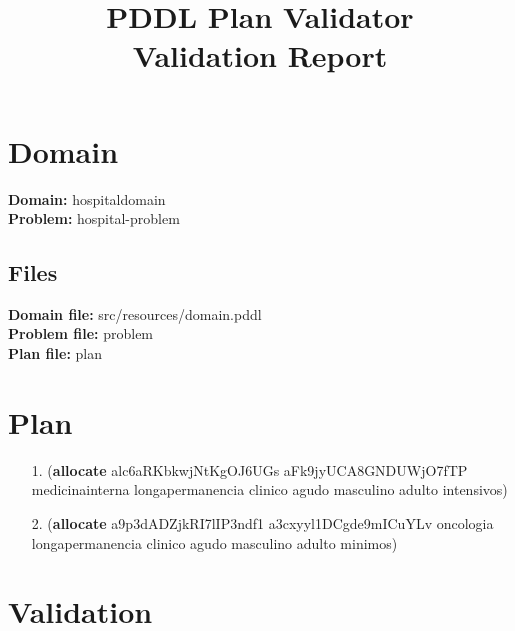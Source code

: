 \documentclass{article}
\title{\textbf{PDDL Plan Validator}\\Validation Report}
\date{} %
\begin{document}
\maketitle

\section{Domain}
\textbf{Domain:}  hospitaldomain\\
\textbf{Problem:} hospital-problem

\subsection{Files}
\textbf{Domain file:}  src/resources/domain.pddl \\
\textbf{Problem file:} problem\\
\textbf{Plan file:}    plan

\section{Plan}

\begin{itemize}
    \item[1.] (\textbf{allocate} alc6aRKbkwjNtKgOJ6UGs aFk9jyUCA8GNDUWjO7fTP medicinainterna longapermanencia clinico agudo masculino adulto intensivos)
    \item[2.] (\textbf{allocate} a9p3dADZjkRI7lIP3ndf1 a3cxyyl1DCgde9mICuYLv oncologia longapermanencia clinico agudo masculino adulto minimos)
\end{itemize}

\section{Validation}
\end{document}
